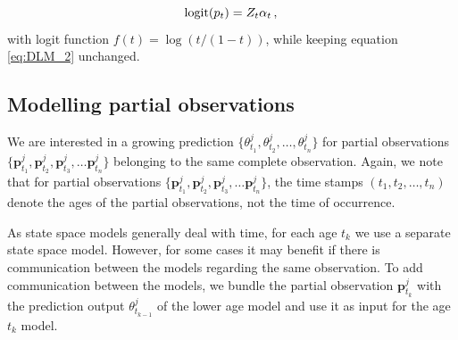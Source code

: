 \documentclass[a4paper,11pt]{article}
\begin{document}
\begin{equation}\label{eq:GDLM_2} 
	\text{logit}(p_t) =   Z_t \alpha_t \, ,              \\
\end{equation}
with logit function $f(t)=\log(t/(1-t))$, while keeping equation \eqref{eq:DLM_2} unchanged. 

\subsection{Modelling partial observations}

We are interested in a growing prediction $\{\theta^j_{t_1}, \theta^j_{t_2}, \dots, \theta^j_{t_n} \}$ for partial observations $\{\bm{p}^j_{t_1},\bm{p}^j_{t_2}, \bm{p}^j_{t_3}, \ldots \bm{p}^j_{t_n}\}$ belonging to the same complete observation. Again, we note that for partial observations $\{\bm{p}^j_{t_1},\bm{p}^j_{t_2}, \bm{p}^j_{t_3}, \ldots \bm{p}^j_{t_n}\}$, the time stamps $(t_1, t_2, \ldots, t_n)$ denote the ages of the partial observations, not the time of occurrence. %

As state space models generally deal with time, for each age $t_k$ we use a separate state space model. However, for some cases it may benefit if there is communication between the models regarding the same observation. To add communication between the models, we bundle the partial observation $\bm{p}^j_{t_k}$ with the prediction output $\theta^j_{t_{k-1}}$ of the lower age model and use it as input for the age $t_k$ model. %
\end{document}
